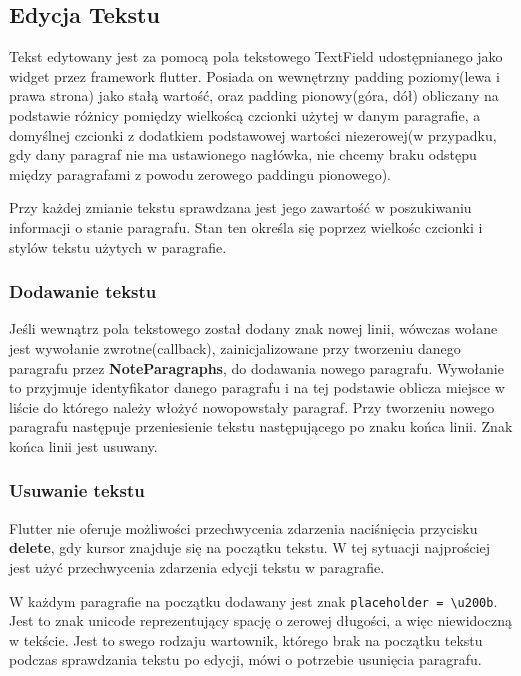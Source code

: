 \subsection{Edycja Tekstu}

Tekst edytowany jest za pomocą pola tekstowego TextField udostępnianego jako widget przez framework flutter. Posiada on wewnętrzny padding poziomy(lewa i prawa strona) jako stałą wartość, oraz padding pionowy(góra, dół) obliczany na podstawie różnicy pomiędzy wielkoścą czcionki użytej w danym paragrafie, a domyślnej czcionki z dodatkiem podstawowej wartości niezerowej(w przypadku, gdy dany paragraf nie ma ustawionego nagłówka, nie chcemy braku odstępu między paragrafami z powodu zerowego paddingu pionowego).

Przy każdej zmianie tekstu sprawdzana jest jego zawartość w poszukiwaniu informacji o stanie paragrafu. Stan ten określa się poprzez wielkośc czcionki i stylów tekstu użytych w paragrafie.

\subsubsection{Dodawanie tekstu}

Jeśli wewnątrz pola tekstowego został dodany znak nowej linii, wówczas wołane jest wywołanie zwrotne(callback), zainicjalizowane przy tworzeniu danego paragrafu przez \textbf{NoteParagraphs}, do dodawania nowego paragrafu. Wywołanie to przyjmuje identyfikator danego paragrafu i na tej podstawie oblicza miejsce w liście do którego należy włożyć nowopowstały paragraf. Przy tworzeniu nowego paragrafu następuje przeniesienie tekstu następującego po znaku końca linii. Znak końca linii jest usuwany.

\subsubsection{Usuwanie tekstu}
\label{eq:usuwanieTekstu}

Flutter nie oferuje możliwości przechwycenia zdarzenia naciśnięcia przycisku \textbf{delete}, gdy kursor znajduje się na początku tekstu. W tej sytuacji najprościej jest użyć przechwycenia zdarzenia edycji tekstu w paragrafie.

W każdym paragrafie na początku dodawany jest znak \verb|placeholder = \u200b|. Jest to znak unicode reprezentujący spację o zerowej długości, a więc niewidoczną w tekście. Jest to swego rodzaju wartownik, którego brak na początku tekstu podczas sprawdzania tekstu po edycji, mówi o potrzebie usunięcia paragrafu.

